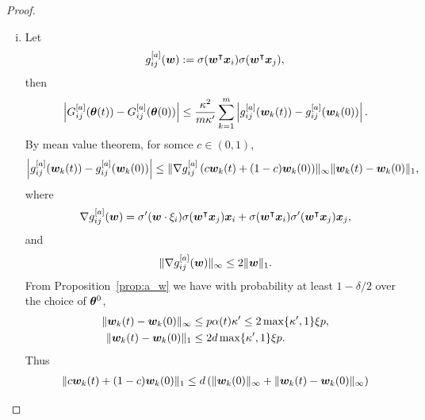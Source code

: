 \documentclass{article}
\begin{document}
\begin{proof}
\begin{enumerate}[(a)]
\begin{enumerate}[(i)]
                  \item Let
                        \begin{equation*}
                            g^{[a]}_{ij}(\bm{w}) := \sigma(\bm{w}^\intercal\bm{x}_i)\sigma(\bm{w}^\intercal\bm{x}_j),
                        \end{equation*}
                        then
                        \begin{equation*}
                            \left\lvert G_{ij}^{[a]}(\bm{\theta}(t)) - G_{ij}^{[a]}(\bm{\theta}(0))\right\rvert \leq \frac{\kappa^2}{m\kappa'}\sum_{k=1}^m \left\lvert g^{[a]}_{ij}(\bm{w}_k(t)) - g^{[a]}_{ij}(\bm{w}_k(0))\right\rvert.
                        \end{equation*}
                        By mean value theorem, for somce $c\in(0,1)$,
                        \begin{equation*}
                            \left\lvert g^{[a]}_{ij}(\bm{w}_k(t)) - g^{[a]}_{ij}(\bm{w}_k(0))\right\rvert \leq \lVert\nabla g^{[a]}_{ij}\left(c\bm{w}_k(t) + (1-c)\bm{w}_k(0)\right)\rVert_{\infty}\lVert\bm{w}_k(t) - \bm{w}_k(0)\rVert_1,
                        \end{equation*}
                        where
                        \begin{equation*}
                            \nabla g_{ij}^{[a]}(\bm{w})=\sigma'(\bm{w}\cdot\xi_i)\sigma(\bm{w}^\intercal\bm{x}_j)\bm{x}_i+\sigma(\bm{w}^\intercal\bm{x}_i)\sigma'(\bm{w}^\intercal\bm{x}_j)\bm{x}_j,
                        \end{equation*}
                        and
                        \begin{equation*}
                            \lVert\nabla g_{ij}^{[a]}(\bm{w})\rVert_{\infty}\leq 2\lVert\bm{w}\rVert_1.
                        \end{equation*}
                        From Proposition~\ref{prop:a_w} we have with probability at least $1-\delta/2$ over the choice of $\bm{\theta}^0$,
                        \begin{align*}
                            \lVert\bm{w}_k(t)-\bm{w}_k(0)\rVert_{\infty} & \leq p\alpha(t)\kappa'\leq 2\max\{\kappa',1\}\xi p, \\
                            \lVert\bm{w}_k(t)-\bm{w}_k(0)\rVert_1        & \leq 2d\max\{\kappa',1\}\xi p.
                        \end{align*}
                        Thus
                        \begin{equation*}
                            \begin{aligned}
                                \norm{c\vw_k(t) + (1-c)\vw_k(0)}_1
                                 & \leq d\left(\norm{\vw_k(0)}_{\infty} + \norm{\vw_k(t) - \vw_k(0)}_{\infty}\right) \\

\end{aligned}
\end{equation*}
\end{enumerate}
\end{enumerate}
\end{proof}
\end{document}
